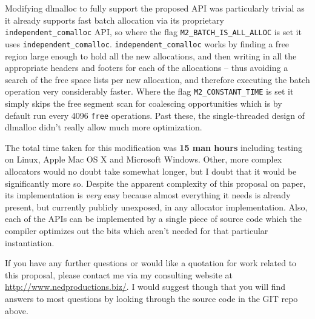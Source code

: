 \documentclass[wd]{isov2}
\begin{document}
{Modifying dlmalloc to fully support the proposed API was particularly trivial as it already supports fast batch allocation via its proprietary \texttt{independent\_comalloc} API, so where the flag \texttt{M2\_BATCH\_IS\_ALL\_ALLOC} is set it uses \texttt{independent\_comalloc}. \texttt{independent\_comalloc} works by finding a free region large enough to hold all the new allocations, and then writing in all the appropriate headers and footers for each of the allocations -- thus avoiding a search of the free space lists per new allocation, and therefore executing the batch operation very considerably faster. Where the flag \texttt{M2\_CONSTANT\_TIME} is set it simply skips the free segment scan for coalescing opportunities which is by default run every 4096 \texttt{free} operations. Past these, the single-threaded design of dlmalloc didn't really allow much more optimization.

The total time taken for this modification was \textbf{15 man hours} including testing on Linux, Apple Mac OS X and Microsoft Windows. Other, more complex allocators would no doubt take somewhat longer, but I doubt that it would be significantly more so. Despite the apparent complexity of this proposal on paper, its implementation is \emph{very} easy because almost everything it needs is already present, but currently publicly unexposed, in any allocator implementation. Also, each of the APIs can be implemented by a single piece of source code which the compiler optimizes out the bits which aren't needed for that particular instantiation.

If you have any further questions or would like a quotation for work related to this proposal, please contact me via my consulting website at \url{http://www.nedproductions.biz/}. I would suggest though that you will find answers to most questions by looking through the source code in the GIT repo above.

\bibannex
\begin{nreferences}

\end{nreferences}

}
\end{document}
